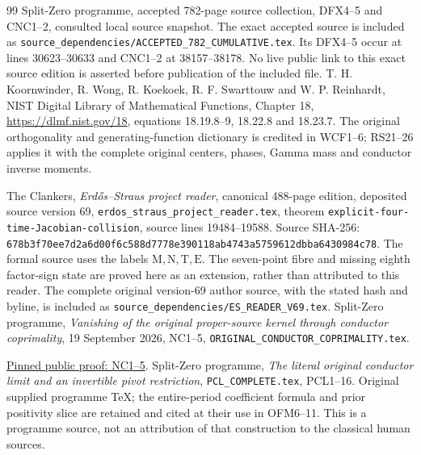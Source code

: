 \documentclass[11pt]{article}
\begin{document}
\begin{thebibliography}{99}
 Split-Zero programme, accepted 782-page source
collection, DFX4--5 and CNC1--2, consulted local source snapshot.
 The exact accepted source is included as
\nolinkurl{source_dependencies/ACCEPTED_782_CUMULATIVE.tex}.
Its DFX4--5 occur at lines 30623--30633 and CNC1--2 at
38157--38178. No live public link to this exact source edition
is asserted before publication of the included file.
 T. H. Koornwinder, R. Wong, R. Koekoek,
R. F. Swarttouw and W. P. Reinhardt,
NIST Digital Library of Mathematical Functions, Chapter 18,
\url{https://dlmf.nist.gov/18}, equations 18.19.8--9,
18.22.8 and 18.23.7. The original orthogonality and generating-function
dictionary is credited in WCF1--6; RS21--26 applies it with the complete
original centers, phases, Gamma mass and conductor inverse moments.


 The Clankers, \emph{Erd\H{o}s--Straus project reader},
canonical 488-page edition, deposited source version 69,
\texttt{erdos\_straus\_project\_reader.tex}, theorem
\texttt{explicit-four-time-Jacobian-collision}, source lines
19484--19588. Source SHA-256:
\texttt{678b3f70ee7d2a6d00f6c588d7778e390118ab4743a5759612dbba6430984c78}.
The formal source uses the labels $\mathrm M,\mathrm N,\mathrm T,\mathrm E$.
The seven-point fibre and missing eighth factor-sign state are proved
here as an extension, rather than attributed to this reader.
 The complete original version-69 author source,
with the stated hash and byline, is included as
\nolinkurl{source_dependencies/ES_READER_V69.tex}.
 Split-Zero programme, \emph{Vanishing of the original
proper-source kernel through conductor coprimality}, 19 September 2026,
NC1--5, \texttt{ORIGINAL\_CONDUCTOR\_COPRIMALITY.tex}.

\href{https://github.com/KokunoYumeto/zeta-function-research-reader/blob/487253b5b01851da5b9b98af4e146fecf1fab902/workbenches/splitzero-tandem/continuations/20260919-native-conductor-coprimality/ORIGINAL_CONDUCTOR_COPRIMALITY.tex#L41}{Pinned public proof: NC1--5}.
 Split-Zero programme,
\emph{The literal original conductor limit and an invertible pivot restriction},
\texttt{PCL\_COMPLETE.tex}, PCL1--16. Original supplied programme TeX;
the entire-period coefficient formula and prior positivity slice are
retained and cited at their use in OFM6--11. This is a programme source,
not an attribution of that construction to the classical human sources.




\end{thebibliography}
\end{document}
